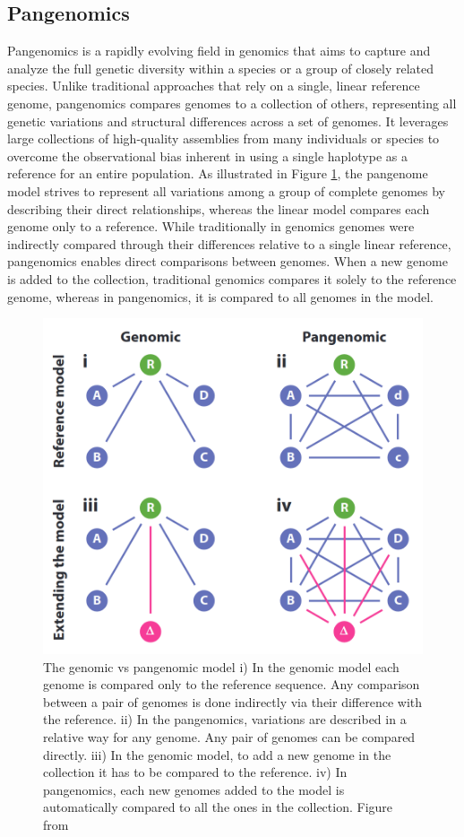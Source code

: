\subsection{Pangenomics}
Pangenomics is a rapidly evolving field in genomics that aims to capture and analyze the full genetic diversity within a species or a group of closely related species. Unlike traditional approaches that rely on a single, linear reference genome, pangenomics compares genomes to a collection of others, representing all genetic variations and structural differences across a set of genomes. It leverages large collections of high-quality assemblies from many individuals or species to overcome the observational bias inherent in using a single haplotype as a reference for an entire population. As illustrated in Figure \ref{fig:pangenomics_model}, the pangenome model strives to represent all variations among a group of complete genomes by describing their direct relationships, whereas the linear model compares each genome only to a reference. While traditionally in genomics genomes were indirectly compared through their differences relative to a single linear reference, pangenomics enables direct comparisons between genomes. When a new genome is added to the collection, traditional genomics compares it solely to the reference genome, whereas in pangenomics, it is compared to all genomes in the model.
\begin{figure}[h!]
	\centering
	\includegraphics[width=.75\linewidth]{figures/background/pangenome_model.png}
	\caption[The Pangenome model.]{The genomic vs pangenomic model i) In the genomic model each genome is compared only to the reference sequence. Any comparison between a pair of genomes is done indirectly via their difference with the reference. ii) In the pangenomics, variations are described in a relative way for any genome. Any pair of genomes can be compared directly. iii) In the genomic model, to add a new genome in the collection it has to be compared to the reference. iv) In pangenomics, each new genomes added to the model is automatically compared to all the ones in the collection. Figure from~\cite{eizenga}\\}
	\label{fig:pangenomics_model}
\end{figure}
